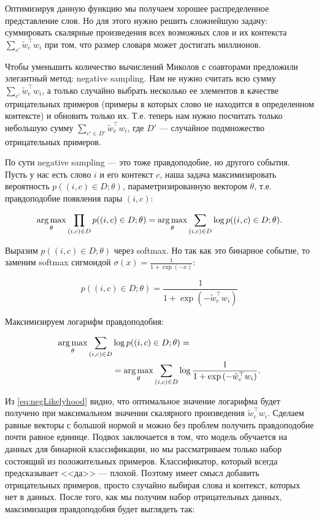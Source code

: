 Оптимизируя данную функцию мы получаем хорошее распределенное представление слов. Но для этого нужно решить сложнейшую задачу: суммировать скалярные произведения всех возможных слов и их контекста $\sum_{c'} \tilde{w}_c^\top w_i$ при том, что размер словаря может достигать миллионов.

\bigskip
Чтобы уменьшить количество вычислений Миколов с соавторами \cite{Mikolov:2} предложили элегантный метод: negative sampling. Нам не нужно считать всю сумму $\sum_{c'} \tilde{w}_c^\top w_i$, а только случайно выбрать несколько ее элементов в качестве отрицательных примеров (примеры в которых слово не находится в определенном контексте) и обновить только их. Т.е. теперь нам нужно посчитать только небольшую сумму $\sum_{c' \in D'} \tilde{w}_c^\top w_i$, где $D'$ --- случайное подмножество отрицательных примеров.

\bigskip
По сути negative sampling --- это тоже правдоподобие, но другого события. Пусть у нас есть слово $i$ и его контекст $c$, наша задача максимизировать вероятность $p((i,c) \in D; \theta)$, параметризированную вектором $\theta$, т.е. правдоподобие появления пары $(i,c)$:

\begin{equation}
 \operatorname*{arg\,max}_{\theta} \prod_{(i,c)\in D} p((i,c)\in D;\theta) = \operatorname*{arg\,max}_{\theta} \sum_{(i,c)\in D} \log{ p((i,c)\in D;\theta)}.
\end{equation}

Выразим $p((i,c)\in D;\theta)$ через softmax. Но так как это бинарное событие, то заменим softmax сигмоидой $\sigma (x) = \frac{1}{1+\exp{(-x)}}$:

\begin{equation}
 p((i,c)\in D;\theta) = \frac{1}{1+\exp{(-\tilde{w}_c^{\top} w_i)}}
\end{equation}

Максимизируем логарифм правдоподобия:

\begin{equation} \label{eq:negLikelyhood}
\begin{aligned}
 \operatorname*{arg\,max}_{\theta} \sum_{(i,c)\in D} & \log{p((i,c)\in D;\theta)} = \\
 & = \operatorname*{arg\,max}_{\theta} \sum_{(i,c)\in D} \log{\frac{1}{1+\exp{(-\tilde{w}_c^{\top} w_i)}}}.
\end{aligned}
\end{equation}

Из \ref{eq:negLikelyhood} видно, что оптимальное значение логарифма будет получено при максимальном значении скалярного произведения $\tilde{w}_c^{\top} w_i$. Сделаем равные векторы с большой нормой и можно без проблем получить правдоподобие почти равное единице. Подвох заключается в том, что модель обучается на данных для бинарной классификации, но мы рассматриваем только набор состоящий из положительных примеров. Классификатор, который всегда предсказывает <<да>> --- плохой. Поэтому имеет смысл добавить отрицательных примеров, просто случайно выбирая слова и контекст, которых нет в данных. После того, как мы получим набор отрицательных данных, максимизация правдоподобия будет выглядеть так:

